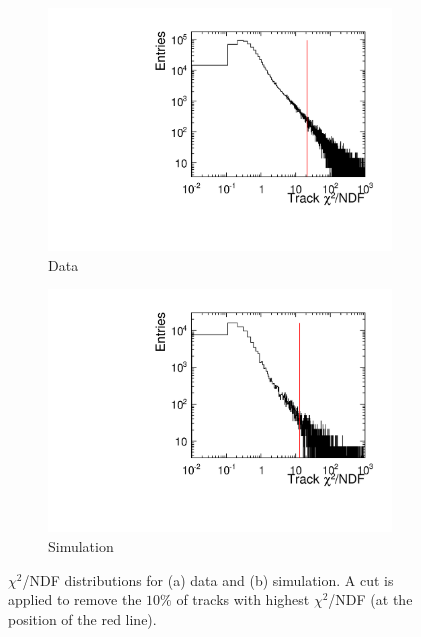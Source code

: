 \begin{figure}[htbp] \centering
  \begin{subfigure}[b]{0.45\textwidth}
    \includegraphics[width=\textwidth]{figures/Telescope/biasedResiduals/chi2_run661.pdf}
    \caption{Data}
  \end{subfigure}\hfill
  \begin{subfigure}[b]{0.45\textwidth}
    \includegraphics[width=\textwidth]{figures/Telescope/biasedResiduals/chi2_run73.pdf}
    \caption{Simulation}
  \end{subfigure}
  \caption{$\chi^2$/NDF distributions for (a) data and (b)
    simulation. A cut is applied to remove the $10\%$ of tracks with
    highest $\chi^2$/NDF (at the position of the red line).}
  \label{fig:chi2_data_simu}
\end{figure}

